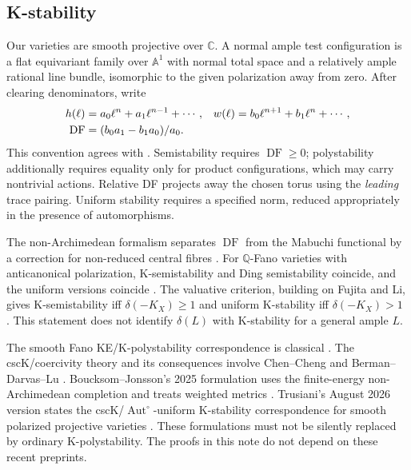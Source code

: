 \documentclass[12pt]{amsart}
\theoremstyle{definition}
\theoremstyle{remark}
\numberwithin{equation}{section}
\DeclareMathOperator{\Autop}{Aut}
\newcommand{\C}{\mathbb{C}}
\newcommand{\Q}{\mathbb{Q}}
\DeclareMathOperator{\DF}{DF}
\begin{document}
\subsection{K-stability}
Our varieties are smooth projective over $\C$. A normal ample test configuration is a flat equivariant family over $\mathbb A^1$ with normal total space and a relatively ample rational line bundle, isomorphic to the given polarization away from zero. After clearing denominators, write
\begin{align}\label{en-DF}
h(\ell)&=a_0\ell^n+a_1\ell^{n-1}+\cdots,&
w(\ell)&=b_0\ell^{n+1}+b_1\ell^n+\cdots,\notag\\
\DF&=(b_0a_1-b_1a_0)/a_0.
\end{align}
This convention agrees with \cite[\S2]{en-SS}. Semistability requires $\DF\geq0$; polystability additionally requires equality only for product configurations, which may carry nontrivial actions. Relative DF projects away the chosen torus using the \emph{leading} trace pairing. Uniform stability requires a specified norm, reduced appropriately in the presence of automorphisms.

The non-Archimedean formalism separates $\DF$ from the Mabuchi functional by a correction for non-reduced central fibres \cite{en-BHJ}. For $\Q$-Fano varieties with anticanonical polarization, K-semistability and Ding semistability coincide, and the uniform versions coincide \cite{en-Fuj}. The valuative criterion, building on Fujita and Li, gives K-semistability iff $\delta(-K_X)\geq1$ and uniform K-stability iff $\delta(-K_X)>1$ \cite[Theorem B]{en-BluJ}. This statement does not identify $\delta(L)$ with K-stability for a general ample $L$.

The smooth Fano KE/K-polystability correspondence is classical \cite{en-CDS}. The cscK/coercivity theory and its consequences involve Chen--Cheng and Berman--Darvas--Lu \cite{en-CC,en-BDL}. Boucksom--Jonsson's 2025 formulation uses the finite-energy non-Archimedean completion and treats weighted metrics \cite{en-BJ25}. Trusiani's August 2026 version states the cscK/$\Autop^\circ$-uniform K-stability correspondence for smooth polarized projective varieties \cite{en-Tru26}. These formulations must not be silently replaced by ordinary K-polystability. The proofs in this note do not depend on these recent preprints.
\end{document}
